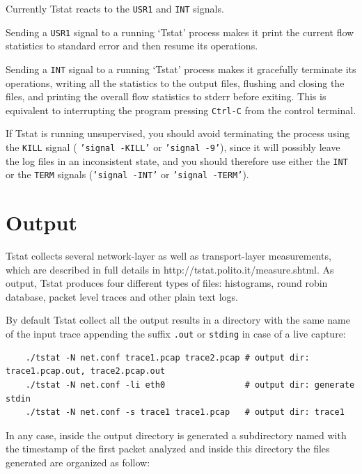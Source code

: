 \documentclass[11pt]{article}
\begin{document}
Currently Tstat reacts to the \texttt{USR1} and \texttt{INT} signals.



Sending a \texttt{USR1} signal to a running ‘Tstat’ process makes it print the current flow 
statistics to standard error and then resume its operations.



Sending a \texttt{INT} signal to a running ‘Tstat’ process makes it gracefully terminate its 
operations, writing all the statistics to the output files, flushing and closing the files, and
printing the overall flow statistics to stderr before exiting. This is equivalent to interrupting
the program pressing \texttt{Ctrl-C} from the control terminal.



If Tstat is running unsupervised, you should avoid terminating the process using the \texttt{KILL} signal
( \texttt{'signal -KILL'} or \texttt{'signal -9'}), since it will possibly leave the log files in an 
inconsistent state, and you should therefore use either the \texttt{INT} or the \texttt{TERM} signals
 (\texttt{'signal -INT'} or \texttt{'signal -TERM'}).

\section{Output\label{Output}}


Tstat collects several network-layer as well as transport-layer measurements,
which are described in full details in \textsf{http://tstat.polito.it/measure.shtml}.
As output, Tstat produces four different types of files: histograms, round robin database, 
packet level traces and other plain text logs.



By default Tstat collect all the output results in a directory with the same name of the input 
trace appending the suffix \texttt{.out} or \texttt{stding} in case of a live capture:

\begin{small}\begin{verbatim}
    ./tstat -N net.conf trace1.pcap trace2.pcap # output dir: trace1.pcap.out, trace2.pcap.out
    ./tstat -N net.conf -li eth0                # output dir: generate stdin   
    ./tstat -N net.conf -s trace1 trace1.pcap   # output dir: trace1
\end{verbatim}\end{small} \noindent
In any case, inside the output directory is generated a subdirectory named with the
timestamp of the first packet analyzed and inside this directory the files generated
are organized as follow:
\end{document}
